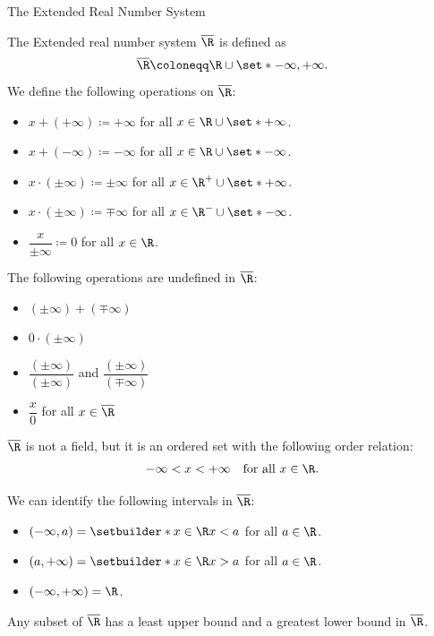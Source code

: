 \begin{section}{The Extended Real Number System}

The Extended real number system $\overline{\R}$ is defined as
\[
\overline{\R} \coloneqq \R \cup \set*{- \infty, + \infty}.
\]
We define the following operations on $\overline{\R}$:
\begin{itemize}
    \item $x + (+ \infty) \coloneqq + \infty$ for all $x \in \R \cup \set*{+ \infty}$.
    \item $x + (- \infty) \coloneqq - \infty$ for all $x \in \R \cup \set*{- \infty}$.
    \item $x \cdot (\pm \infty) \coloneqq \pm \infty$ for all $x \in \R^{+} \cup \set*{+ \infty}$.
    \item $x \cdot (\pm \infty) \coloneqq \mp \infty$ for all $x \in \R^{-} \cup \set*{- \infty}$.
    \item $\dfrac{x}{\pm \infty} \coloneqq 0$ for all $x \in \R$.
\end{itemize}
The following operations are undefined in $\overline{\R}$:
\begin{itemize}
    \item $(\pm \infty) + (\mp \infty)$
    \item $0 \cdot (\pm \infty)$
    \item $\dfrac{(\pm \infty)}{(\pm \infty)}$ and $\dfrac{(\pm \infty)}{(\mp \infty)}$
    \item $\dfrac{x}{0}$ for all $x \in \overline{\R}$
\end{itemize}
$\overline{\R}$ is not a field, but it is an ordered set with the following order relation:
\[
- \infty < x < + \infty \quad \text{for all } x \in \R.
\]

\bigskip

\begin{remark}
    We can identify the following intervals in $\overline{\R}$:
    \begin{itemize}
        \item $(- \infty, a) = \setbuilder*{x \in \R}{x < a}$ for all $a \in \R$.
        \item $(a, + \infty) = \setbuilder*{x \in \R}{x > a}$ for all $a \in \R$.
        \item $(- \infty, + \infty) = \R$.
    \end{itemize}
\end{remark}

\bigskip

\begin{theorem} \label{thm:SupremumInfimumInExtendedRealNumberSystem}
    Any subset of $\overline{\R}$ has a least upper bound and a greatest lower bound in $\overline{\R}$.
\end{theorem}


\end{section}

